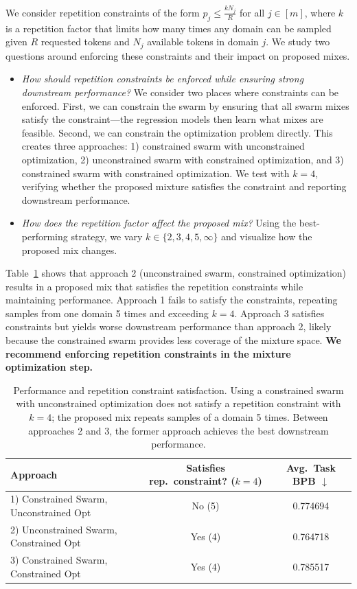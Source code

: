 \documentclass[table]{ai2style/ai2}
\begin{document}
We consider repetition constraints of the form $p_j \le \frac{k N_j}{R}$ for all $j \in [m]$, where $k$ is a repetition factor that limits how many times any domain can be sampled given $R$ requested tokens and $N_j$ available tokens in domain $j$.
We study two questions around enforcing these constraints and their impact on proposed mixes.
\begin{itemize}
    \item \textit{How should repetition constraints be enforced while ensuring strong downstream performance?} 
    We consider two places where constraints can be enforced. First, we can constrain the swarm by ensuring that all swarm mixes satisfy the constraint---the regression models then learn what mixes are feasible. Second, we can constrain the optimization problem directly. This creates three approaches: 1) constrained swarm with unconstrained optimization, 2) unconstrained swarm with constrained optimization, and 3) constrained swarm with constrained optimization.     
    We test with $k=4$, verifying whether the proposed mixture satisfies the constraint and reporting downstream performance.
    
    \item \textit{How does the repetition factor affect the proposed mix?} Using the best-performing strategy, we vary $k \in \{2, 3, 4, 5, \infty \}$ and visualize how the proposed mix changes.

\end{itemize}

Table~\ref{tab:enforce_rep} shows that approach 2 (unconstrained swarm, constrained optimization) results in a proposed mix that satisfies the repetition constraints while maintaining performance. Approach 1 fails to satisfy the constraints, repeating samples from one domain 5 times and exceeding $k=4$. Approach 3 satisfies constraints but yields worse downstream performance than approach 2, likely because the constrained swarm provides less coverage of the mixture space. \textbf{We recommend enforcing repetition constraints in the mixture optimization step.}

\begin{table}[t]
\centering
\caption{Performance and repetition constraint satisfaction. Using a constrained swarm with unconstrained optimization does not satisfy a repetition constraint with $k=4$; the proposed mix repeats samples of a domain 5 times. Between approaches 2 and 3, the former approach achieves the best downstream performance.}
\begin{tabular}{lcc}
\toprule
Approach &
Satisfies rep.\ constraint? ($k=4$) &
Avg.\ Task BPB $\downarrow$ \\
\midrule
1) Constrained Swarm, Unconstrained Opt   & No (5)  & 0.774694 \\
\rowcolor{ai2lightpink}
2) Unconstrained Swarm, Constrained Opt  & Yes (4) & 0.764718 \\
3) Constrained Swarm, Constrained Opt    & Yes (4) & 0.785517 \\
\bottomrule
\end{tabular}
\label{tab:enforce_rep}
\end{table}
\end{document}
